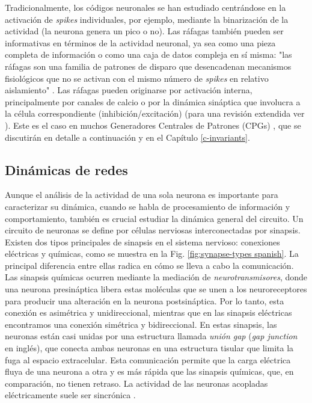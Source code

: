 Tradicionalmente, los códigos neuronales se han estudiado centrándose en la activación de \textit{spikes} individuales, por ejemplo, mediante la binarización de la actividad (la neurona genera un pico o no). Las ráfagas también pueden ser informativas en términos de la actividad neuronal, ya sea como una pieza completa de información o como una caja de datos compleja en sí misma: "las ráfagas son una familia de patrones de disparo que desencadenan mecanismos fisiológicos que no se activan con el mismo número de \textit{spikes} en relativo aislamiento" \parencite{friedenberger_silences_2023}. Las ráfagas pueden originarse por activación interna, principalmente por canales de calcio o por la dinámica sináptica que involucra a la célula correspondiente (inhibición/excitación) (para una revisión extendida ver \parencite{friedenberger_silences_2023}). Este es el caso en muchos Generadores Centrales de Patrones (CPGs) \parencite{katz_evolution_2016,steuer_central_2018}, que se discutirán en detalle a continuación y en el Capítulo \ref{c-invariants}.

\subsection{Dinámicas de redes}

Aunque el análisis de la actividad de una sola neurona es importante para caracterizar su dinámica, cuando se habla de procesamiento de información y comportamiento, también es crucial estudiar la dinámica general del circuito. Un circuito de neuronas se define por células nerviosas interconectadas por sinapsis. Existen dos tipos principales de sinapsis en el sistema nervioso: conexiones eléctricas y químicas, como se muestra en la Fig. \ref{fig:synapse-types spanish}. La principal diferencia entre ellas radica en cómo se lleva a cabo la comunicación. Las sinapsis químicas ocurren mediante la mediación de \textit{neurotransmisores}, donde una neurona presináptica libera estas moléculas que se unen a los neuroreceptores para producir una alteración en la neurona postsináptica. Por lo tanto, esta conexión es asimétrica y unidireccional, mientras que en las sinapsis eléctricas encontramos una conexión simétrica y bidireccional. En estas sinapsis, las neuronas están casi unidas por una estructura llamada \textit{unión gap} (\textit{gap junction} en inglés), que conecta ambas neuronas en una estructura tisular que limita la fuga al espacio extracelular. Esta comunicación permite que la carga eléctrica fluya de una neurona a otra y es más rápida que las sinapsis químicas, que, en comparación, no tienen retraso. La actividad de las neuronas acopladas eléctricamente suele ser sincrónica \parencite{levitan_neuron_2002}.


